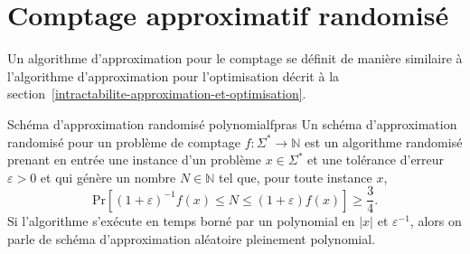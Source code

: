 \section{Comptage approximatif randomisé}

Un algorithme d'approximation pour le comptage se définit de manière similaire à l'algorithme d'approximation pour l'optimisation décrit à la section~\ref{intractabilite-approximation-et-optimisation}.

\begin{maindefinition}{Schéma d'approximation randomisé polynomial}{fpras}
    Un schéma d'approximation randomisé pour un problème de comptage $f: \Sigma^{*} \to \mathbb{N}$ est un algorithme randomisé prenant en entrée une instance d'un problème $x \in \Sigma^{*}$ et une tolérance d'erreur $\varepsilon > 0$ et qui génère un nombre $N \in \mathbb{N}$ tel que, pour toute instance $x$,
    \begin{equation*}
        \mathrm{ Pr }\left[(1+\varepsilon)^{-1} f(x) \leq N \leq (1+\varepsilon)f(x)\right] \geq \frac{3}{4} .
    \end{equation*}
    Si l'algorithme s'exécute en temps borné par un polynomial en $\lvert x \rvert$ et $\varepsilon^{-1}$, alors on parle de schéma d'approximation aléatoire pleinement polynomial.
\end{maindefinition}

